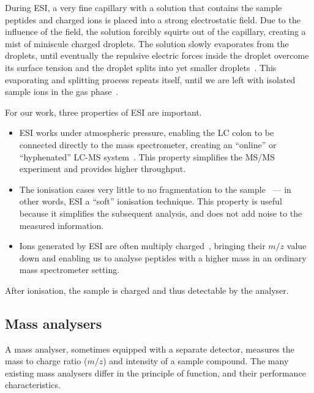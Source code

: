 During ESI, a very fine capillary with a solution that contains the sample peptides and charged ions is placed into a strong electrostatic field. Due to the influence of the field, the solution forcibly squirts out of the capillary, creating a mist of miniscule charged droplets. The solution slowly evaporates from the droplets, until eventually the repulsive electric forces inside the droplet overcome its surface tension and the droplet splits into yet smaller droplets~\cite{rayleigh1882xx}. This evaporating and splitting process repeats itself, until we are left with isolated sample ions in the gas phase~\cite{dole1968molecular,dole1968gas,fenn1989electrospray, fenn1990electrospray}.

For our work, three properties of ESI are important.

\begin{itemize}
  \item ESI works under atmospheric pressure, enabling the LC colon to be connected directly to the mass spectrometer, creating an ``online'' or ``hyphenated'' LC-MS system~\cite{opiteck1997comprehensive}. This property simplifies the MS/MS experiment and provides higher throughput.
  \item The ionisation cases very little to no fragmentation to the sample~\cite{griffiths2001electrospray} --- in other words, ESI a ``soft'' ionisation technique. This property is useful because it simplifies the subsequent analysis, and does not add noise to the measured information.
  \item  Ions generated by ESI are often multiply charged~\cite{felitsyn2002origin}, bringing their \(m/z\) value down and enabling us to analyse peptides with a higher mass in an ordinary mass spectrometer setting.
\end{itemize}

After ionisation, the sample is charged and thus detectable by the analyser.

\subsection{Mass analysers}\label{sec:msms-analysis}

A mass analyser, sometimes equipped with a separate detector, measures the mass to charge ratio (\(m/z\)) and intensity of a sample compound. The many existing mass analysers differ in the principle of function, and their performance characteristics.

